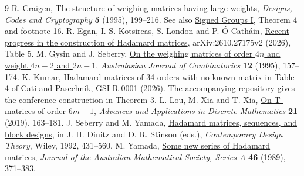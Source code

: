 \documentclass[10pt]{article}
\begin{document}
\clearpage
\begin{thebibliography}{9}
 R. Craigen, The structure of weighing matrices having large weights,
\emph{Designs, Codes and Cryptography} \textbf{5} (1995), 199--216.
See also \href{https://us.ticmeet.com/assets/archivos/d6f1d9b8-d39f-4888-925a-7eb81c4905cc/Craigen_handouts.pdf}{Signed Groups I}, Theorem 4 and footnote 16.
 R. Egan, I. S. Kotsireas, S. London and P. \'{O} Cath\'ain,
\href{https://arxiv.org/abs/2610.27175v2}{Recent progress in the construction of Hadamard matrices}, arXiv:2610.27175v2 (2026), Table 5.
 M. Gysin and J. Seberry, \href{https://documents.uow.edu.au/~jennie/WEBPDF/1995_05.pdf}{On the weighing matrices of order $4n$ and weight $4n-2$ and $2n-1$}, \emph{Australasian Journal of Combinatorics} \textbf{12} (1995), 157--174.
 K. Kumar,
\href{https://generalised.si/research/hadamard-matrices}{Hadamard matrices of 34 orders with no known matrix in Table 4 of Cati and Pasechnik}, GSI-R-0001 (2026). The accompanying repository gives the conference construction in Theorem 3.
 L. Lou, M. Xia and T. Xia,
\href{https://doi.org/10.17654/DM021020163}{On T-matrices of order $6m+1$}, \emph{Advances and Applications in Discrete Mathematics} \textbf{21} (2019), 163--181.
 J. Seberry and M. Yamada, \href{https://documents.uow.edu.au/~jennie/WEBPDF/175_1992.pdf}{Hadamard matrices, sequences, and block designs}, in J. H. Dinitz and D. R. Stinson (eds.), \emph{Contemporary Design Theory}, Wiley, 1992, 431--560.
 M. Yamada, \href{https://doi.org/10.1017/S144678870003086X}{Some new series of Hadamard matrices}, \emph{Journal of the Australian Mathematical Society, Series A} \textbf{46} (1989), 371--383.
\end{thebibliography}
\end{document}
